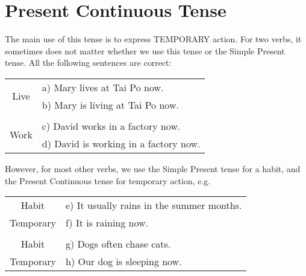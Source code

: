 \newpage
\section{Present Continuous Tense}
The main use of this tense is to express TEMPORARY action.
For two verbs, it sometimes does not matter whether we use this tense or the
Simple Present tense.
All the following sentences are correct:
\begin{center}
\begin{tabular}{|cl|}
    \hline
    \multirow{2}{*}{Live} & a) Mary lives at Tai Po now. \\
                          & b) Mary is living at Tai Po now. \\ 
                          & \\
    \multirow{2}{*}{Work} & c) David works in a factory now. \\
                          & d) David is working in a factory now. \\ \hline
\end{tabular}
\end{center}

However, for most other verbs, we use the Simple Present tense for a habit,
and the Present Continuous tense for temporary action, e.g.
\begin{center}
\begin{tabular}{|cl|}
    \hline
    Habit     & e) It usually rains in the summer months. \\
    Temporary & f) It is raining now. \\
              & \\
    Habit     & g) Dogs often chase cats. \\
    Temporary & h) Our dog is sleeping now. \\ \hline
\end{tabular}
\end{center}

